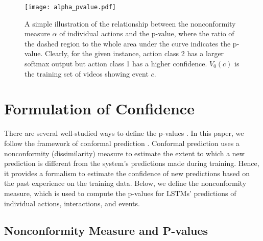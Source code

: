 \documentclass[10pt,twocolumn,letterpaper]{article}
\begin{document}
      \begin{figure}[t!]
      \centering
      \texttt{[image: alpha\_pvalue.pdf]}
      \vspace{-5pt}
      \caption{A simple illustration of the relationship between the nonconformity measure $\alpha$ of individual actions and the p-value, where the ratio of the dashed region to the whole area under the curve indicates the p-value. Clearly, for the given instance, action class 2 has a larger softmax output but action class 1 has a higher confidence. $V_0(c)$ is the training set of videos showing event $c$.}
      \vspace{-10pt}
      \label{fig:alpha_pvalue}
   \end{figure}


 \section{Formulation of Confidence } \label{sec:confidence}  
  
There are several well-studied ways to define the p-values \cite{Fisher1950}. In this paper, we follow the framework of conformal prediction \cite{Shafer2008}. Conformal prediction uses a nonconformity (dissimilarity) measure to estimate the extent to which a new prediction is different from the system's predictions made during training. Hence, it provides a formalism to estimate the confidence of new predictions based on the past experience on the training data. Below, we define the nonconformity measure, which is used to compute the p-values for LSTMs' predictions of individual actions, interactions, and events.

\subsection{Nonconformity Measure and P-values }
\end{document}
